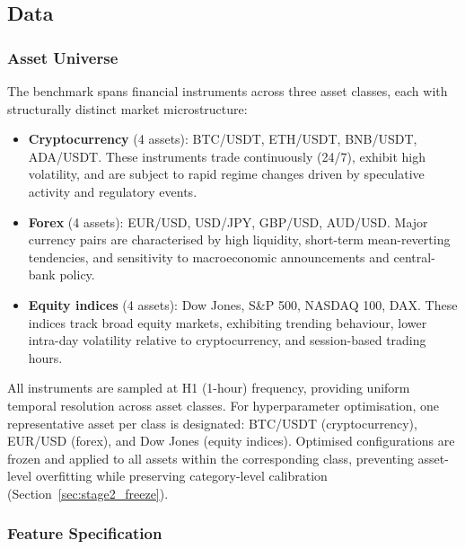 \subsection{Data}
\label{sec:data}

\subsubsection{Asset Universe}
\label{sec:asset_universe}

The benchmark spans \nassets financial instruments across three asset classes, each with structurally distinct market microstructure:

\begin{itemize}
  \item \textbf{Cryptocurrency} (4 assets): BTC/USDT, ETH/USDT, BNB/USDT, ADA/USDT.  These instruments trade continuously (24/7), exhibit high volatility, and are subject to rapid regime changes driven by speculative activity and regulatory events.

  \item \textbf{Forex} (4 assets): EUR/USD, USD/JPY, GBP/USD, AUD/USD.  Major currency pairs are characterised by high liquidity, short-term mean-reverting tendencies, and sensitivity to macroeconomic announcements and central-bank policy.

  \item \textbf{Equity indices} (4 assets): Dow Jones, S\&P 500, NASDAQ 100, DAX.  These indices track broad equity markets, exhibiting trending behaviour, lower intra-day volatility relative to cryptocurrency, and session-based trading hours.
\end{itemize}

All instruments are sampled at H1 (1-hour) frequency, providing uniform temporal resolution across asset classes.  For hyperparameter optimisation, one representative asset per class is designated: BTC/USDT (cryptocurrency), EUR/USD (forex), and Dow Jones (equity indices).  Optimised configurations are frozen and applied to all assets within the corresponding class, preventing asset-level overfitting while preserving category-level calibration (Section~\ref{sec:stage2_freeze}).

\subsubsection{Feature Specification}
\label{sec:feature_spec}

